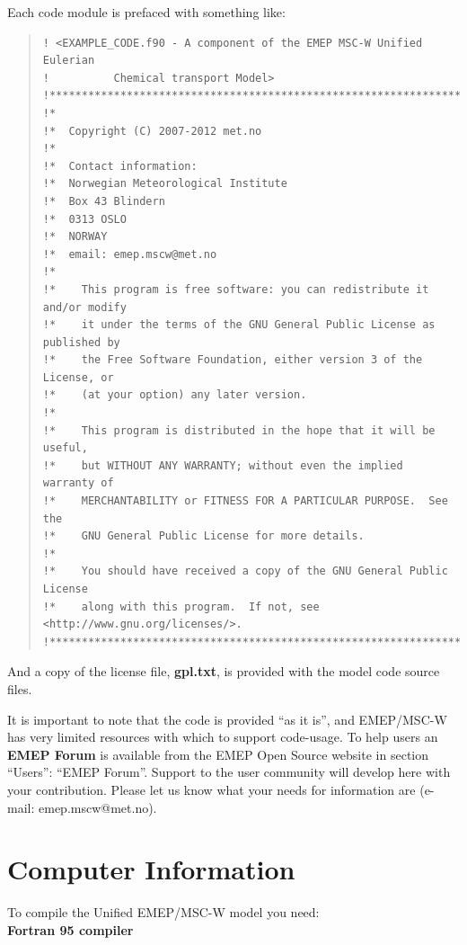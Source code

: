 Each code module is prefaced with something like:
\begin{quote}
\begin{small}
\begin{verbatim}
! <EXAMPLE_CODE.f90 - A component of the EMEP MSC-W Unified Eulerian
!          Chemical transport Model>
!*****************************************************************************!
!*
!*  Copyright (C) 2007-2012 met.no
!*
!*  Contact information:
!*  Norwegian Meteorological Institute
!*  Box 43 Blindern
!*  0313 OSLO
!*  NORWAY
!*  email: emep.mscw@met.no
!*
!*    This program is free software: you can redistribute it and/or modify
!*    it under the terms of the GNU General Public License as published by
!*    the Free Software Foundation, either version 3 of the License, or
!*    (at your option) any later version.
!*
!*    This program is distributed in the hope that it will be useful,
!*    but WITHOUT ANY WARRANTY; without even the implied warranty of
!*    MERCHANTABILITY or FITNESS FOR A PARTICULAR PURPOSE.  See the
!*    GNU General Public License for more details.
!*
!*    You should have received a copy of the GNU General Public License
!*    along with this program.  If not, see <http://www.gnu.org/licenses/>.
!*****************************************************************************!
\end{verbatim}
\end{small}
\end{quote}
And a copy of the license file, {\bf gpl.txt}, is provided with the
model code source files.

\noindent It is important to note that the code is provided ``as it is'', 
and EMEP/MSC-W has very limited resources with which to support
code-usage. To help users an {\bf EMEP Forum} is available from the
EMEP Open Source website in section ``Users'': ``EMEP Forum''. 
Support to the user community will develop here with your
contribution. 
Please let us know what your needs for information are 
(e-mail: emep.mscw@met.no).

\newpage

\section{Computer Information}
\label{sec:compinf}

To compile the Unified EMEP/MSC-W model you need:\\

\textbf{Fortran 95 compiler}

